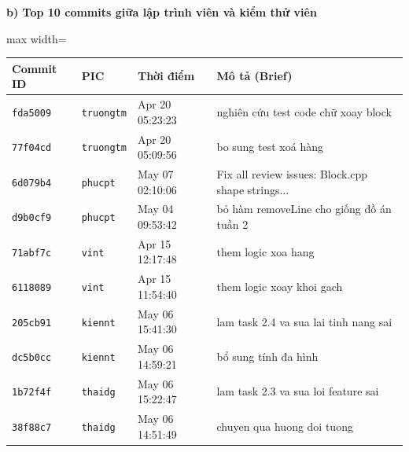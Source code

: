 \documentclass[12pt,a4paper]{article}
\begin{document}
\textbf{b) Top 10 commits giữa lập trình viên và kiểm thử viên}
\begin{table}[H]
\centering
\renewcommand{\arraystretch}{1.2}
\begin{adjustbox}{max width=\textwidth}
\begin{tabular}{|l|l|l|p{6.5cm}|}
\hline
\rowcolor{gray!10}
\textbf{Commit ID} & \textbf{PIC} & \textbf{Thời điểm} & \textbf{Mô tả (Brief)} \\ \hline
\texttt{fda5009} & \texttt{truongtm} & Apr 20 05:23:23 & nghiên cứu test code chữ xoay block \\ \hline
\texttt{77f04cd} & \texttt{truongtm} & Apr 20 05:09:56 & bo sung test xoá hàng \\ \hline
\texttt{6d079b4} & \texttt{phucpt} & May 07 02:10:06 & Fix all review issues: Block.cpp shape strings... \\ \hline
\texttt{d9b0cf9} & \texttt{phucpt} & May 04 09:53:42 & bỏ hàm removeLine cho giống đồ án tuần 2 \\ \hline
\texttt{71abf7c} & \texttt{vint} & Apr 15 12:17:48 & them logic xoa hang \\ \hline
\texttt{6118089} & \texttt{vint} & Apr 15 11:54:40 & them logic xoay khoi gach \\ \hline
\texttt{205cb91} & \texttt{kiennt} & May 06 15:41:30 & lam task 2.4 va sua lai tinh nang sai \\ \hline
\texttt{dc5b0cc} & \texttt{kiennt} & May 06 14:59:21 & bổ sung tính đa hình \\ \hline
\texttt{1b72f4f} & \texttt{thaidg} & May 06 15:22:47 & lam task 2.3 va sua loi feature sai \\ \hline
\texttt{38f88c7} & \texttt{thaidg} & May 06 14:51:49 & chuyen qua huong doi tuong \\ \hline
\end{tabular}
\end{adjustbox}
\end{table}

\end{document}
